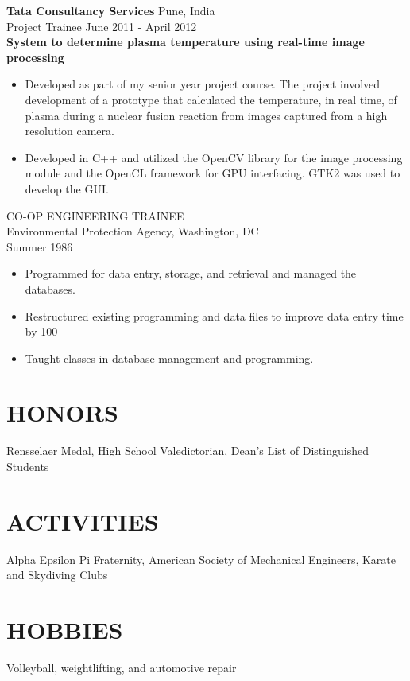 \documentclass[11pt]{res} %
\begin{document}
\begin{resume}
\noindent \textbf{Tata Consultancy Services} \hfill \hfill Pune, India\\
\noindent Project Trainee \hfill \hfill June 2011 - April 2012 \\
\textbf{System to determine plasma temperature using real-time image processing}
\begin{itemize}
\item Developed as part of my senior year project course. The project involved development of a prototype that calculated the
temperature, in real time, of plasma during a nuclear fusion reaction from images captured from a high resolution camera.
\item Developed in C++ and utilized the OpenCV library for the image processing module and the OpenCL framework for GPU
interfacing. GTK2 was used to develop the GUI.
\end{itemize}
CO-OP ENGINEERING TRAINEE \\
Environmental Protection Agency, Washington, DC \\ 
Summer 1986 
\vspace{0.2in}
 \begin{itemize} \itemsep -2pt
   \item Programmed for data entry, storage, and retrieval and managed 
    the databases. 
  \item  Restructured existing programming and data files  to  improve 
    data entry time by 100%
  \item Taught classes in database management and programming. 
\end{itemize} 

\section{HONORS} 
 
Rensselaer  Medal,  High  School  Valedictorian,  Dean's  List of 
Distinguished Students 
 
\section{ACTIVITIES} 
 
Alpha Epsilon  Pi  Fraternity,  American  Society  of  Mechanical 
Engineers, Karate and Skydiving Clubs 
 
\section{HOBBIES} 
 
Volleyball, weightlifting, and automotive repair 
 

\end{resume}
\end{document}
